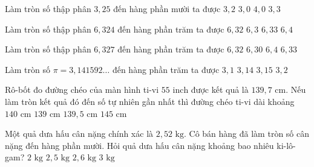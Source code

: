 \begin{ex} %
Làm tròn số thập phân $3{,}25$ đến hàng phần mười ta được
\choice
{$3{,}2$}
{$3{,}0$}
{$4{,}0$}
{\True $3{,}3$}
\end{ex}

\begin{ex} %
Làm tròn số thập phân $6{,}324$ đến hàng phần trăm ta được
\choice
{\True $6{,}32$}
{$6{,}3$}
{$6{,}33$}
{$6{,}4$}
\end{ex}

\begin{ex} %
Làm tròn số thập phân $6{,}327$ đến hàng phần trăm ta được
\choice
{$6{,}32$}
{$6{,}30$}
{$6{,}4$}
{\True $6{,}33$}
\end{ex}

\begin{ex} %
Làm tròn số $\pi = 3{,}141592\dots$ đến hàng phần trăm ta được
\choice
{$3{,}1$}
{\True $3{,}14$}
{$3{,}15$}
{$3{,}2$}
\end{ex}

\begin{ex} %
Rô-bốt đo đường chéo của màn hình ti-vi $55\text{ inch}$ được kết quả là $139{,}7\text{ cm}$. Nếu làm tròn kết quả đó đến số tự nhiên gần nhất thì đường chéo ti-vi dài khoảng
\choice
{\True $140\text{ cm}$}
{$139\text{ cm}$}
{$139{,}5\text{ cm}$}
{$145\text{ cm}$}
\end{ex}

\begin{ex} %
Một quả dưa hấu cân nặng chính xác là $2{,}52\text{ kg}$. Cô bán hàng đã làm tròn số cân nặng đến hàng phần mười. Hỏi quả dưa hấu cân nặng khoảng bao nhiêu ki-lô-gam?
\choice
{$2\text{ kg}$}
{\True $2{,}5\text{ kg}$}
{$2{,}6\text{ kg}$}
{$3\text{ kg}$}
\end{ex}

